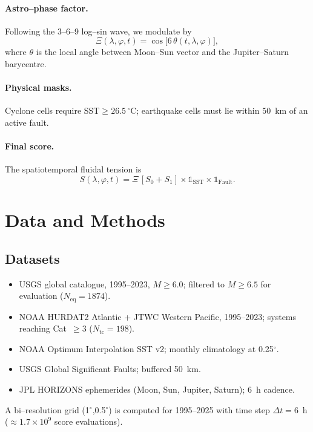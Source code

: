 \documentclass[11pt]{article}
\begin{document}
\paragraph{Astro--phase factor.} Following the 3--6--9 log--sin wave, we modulate by
\begin{equation}
\label{eq:phase}
\Xi(\lambda,\varphi,t)=\cos\bigl[6\,\theta(t,\lambda,\varphi)\bigr],
\end{equation}
where $\theta$ is the local angle between Moon–Sun vector and the Jupiter–Saturn barycentre.
\paragraph{Physical masks.} Cyclone cells require SST$\ge26.5\,^{\circ}$C; earthquake cells must lie within $50$~km of an active fault.
\paragraph{Final score.} The spatiotemporal fluidal tension is
\begin{equation}
S(\lambda,\varphi,t)=\Xi\,[S_0+S_1] \times\mathbb 1_{\text{SST}} \times\mathbb 1_{\text{Fault}}.
\end{equation}

\section{Data and Methods}
\subsection{Datasets}
\begin{itemize}
 \item USGS global catalogue, 1995--2023, $M\ge6.0$; filtered to $M\ge6.5$ for evaluation ($N_{\text{eq}}=1874$).
 \item NOAA HURDAT2 Atlantic + JTWC Western Pacific, 1995--2023; systems reaching Cat~$\ge3$ ($N_{\text{tc}}=198$).
 \item NOAA Optimum Interpolation SST v2; monthly climatology at 0.25$^\circ$.
 \item USGS Global Significant Faults; buffered 50~km.
 \item JPL HORIZONS ephemerides (Moon, Sun, Jupiter, Saturn); 6~h cadence.
\end{itemize}
A bi--resolution grid (1$^\circ$,0.5$^\circ$) is computed for 1995--2025 with time step $\Delta t=6$~h ($\approx1.7\times10^9$ score evaluations).
\end{document}
